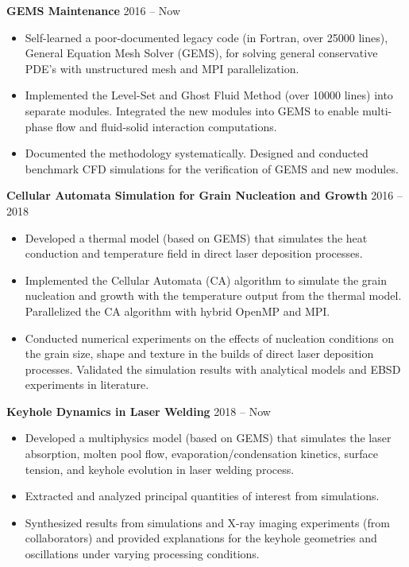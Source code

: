 \documentclass[12pt, letterpaper]{article}
\begin{document}
\vspace{3pt}

\textbf{GEMS Maintenance} \hfill 2016 -- Now
\begin{itemize}[leftmargin=*, labelsep=5mm]
   \item Self-learned a poor-documented legacy code (in Fortran, over 25000 lines), General Equation
      Mesh Solver (GEMS), for solving general conservative PDE's with unstructured mesh and MPI
      parallelization.
   \item Implemented the Level-Set and Ghost Fluid Method (over 10000 lines) into separate modules.
      Integrated the new modules into GEMS to enable multi-phase flow and fluid-solid interaction
      computations.
   \item Documented the methodology systematically. Designed and conducted benchmark CFD
      simulations for the verification of GEMS and new modules.
\end{itemize}

\vspace{3pt}

\textbf{Cellular Automata Simulation for Grain Nucleation and Growth} \hfill 2016 -- 2018
\begin{itemize}[leftmargin=*, labelsep=5mm]
   \item Developed a thermal model (based on GEMS) that simulates the heat conduction and
      temperature field in direct laser deposition processes.
   \item Implemented the Cellular Automata (CA) algorithm to simulate the grain nucleation and
      growth with the temperature output from the thermal model. Parallelized the CA algorithm with
      hybrid OpenMP and MPI.
   \item Conducted numerical experiments on the effects of nucleation conditions on the grain size,
      shape and texture in the builds of direct laser deposition processes. Validated the simulation
      results with analytical models and EBSD experiments in literature.
\end{itemize}

\vspace{3pt}

\textbf{Keyhole Dynamics in Laser Welding} \hfill 2018 -- Now
\begin{itemize}[leftmargin=*, labelsep=5mm]
   \item Developed a multiphysics model (based on GEMS) that simulates the laser absorption, molten
      pool flow, evaporation/condensation kinetics, surface tension, and keyhole evolution in laser
      welding process.
   \item Extracted and analyzed principal quantities of interest from simulations.
   \item Synthesized results from simulations and X-ray imaging experiments (from collaborators) and
      provided explanations for the keyhole geometries and oscillations under varying processing
      conditions.
\end{itemize}
\end{document}
